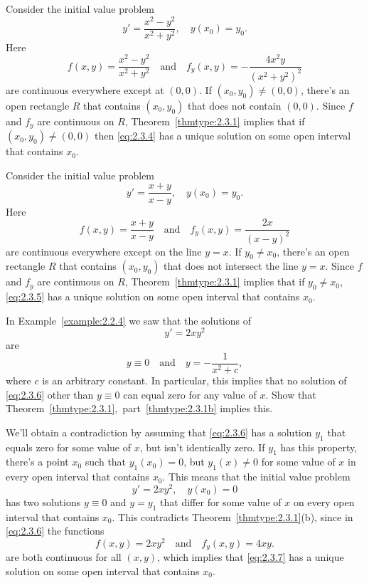 \documentclass{ximera}
\begin{document}
\begin{example}\label{example:2.3.2}
Consider  the initial value problem
\begin{equation} \label{eq:2.3.4}
y'=\frac{x^2-y^2}{x^2+y^2}, \quad y(x_0)=y_0.
\end{equation}
Here
$$
f(x,y)  =  \frac{x^2-y^2}{x^2+y^2} \quad\mbox{and}\quad 
f_y(x,y)  =  -\frac{4x^2y}{(x^2+y^2)^2}
$$
are continuous everywhere except at $(0,0)$. If $(x_0,y_0)
\neq(0,0)$, there's an open rectangle $R$ that contains
$(x_0,y_0)$ that does not contain $(0,0)$. Since $f$ and $f_y$ are
continuous on $R$, Theorem~\ref{thmtype:2.3.1} implies that if
$(x_0,y_0)\neq(0,0)$ then
\eqref{eq:2.3.4}
has a unique solution on some open interval that contains $x_0$.
\end{example}

\begin{example}\label{example:2.3.3}
Consider the initial value problem
\begin{equation} \label{eq:2.3.5}
y'=\frac{x+y}{x-y},\quad y(x_0)=y_0.
\end{equation}
Here
$$
f(x,y)  =  \frac{x+y}{x-y} \quad\mbox{and}\quad 
f_y(x,y)  =  \frac{2x}{(x-y)^2}
$$
are continuous everywhere except on the line $y=x$. If $y_0\neq x_0$,
there's an open rectangle $R$ that contains $(x_0,y_0)$ that
does not intersect the line $y=x$. Since $f$ and $f_y$ are continuous
on $R$, Theorem~\ref{thmtype:2.3.1} implies that if $y_0\neq x_0$,
\eqref{eq:2.3.5} has a unique solution on some open interval that contains
$x_0$.
\end{example}

\begin{example}\label{example:2.3.4}
In Example~\ref{example:2.2.4} we saw that the
solutions of
\begin{equation} \label{eq:2.3.6}
y'=2xy^2
\end{equation}
are
 $$
y\equiv0 \quad\mbox{and}\quad  y=-\frac{1}{x^2+c},
$$
where $c$ is an arbitrary constant. In particular, this implies that
no solution of \eqref{eq:2.3.6} other than $y\equiv0$ can equal zero for
any value of $x$. Show that Theorem~\ref{thmtype:2.3.1},~part~\ref{thmtype:2.3.1b} implies
this.

\begin{explanation}
We'll obtain a contradiction
by assuming that \eqref{eq:2.3.6} has a solution $y_1$ that equals
zero for some value of $x$, but isn't  identically zero. If $y_1$
has this property,  there's a point $x_0$ such that $y_1(x_0)=0$,
but $y_1(x)\neq0$ for some value of $x$ in every open interval that contains
$x_0$. This means that the initial value problem
\begin{equation} \label{eq:2.3.7}
y'=2xy^2,\quad y(x_0)=0
\end{equation}
has two solutions $y\equiv0$ and $y=y_1$ that differ for some value of
$x$ on every open interval that contains $x_0$. This contradicts
Theorem~\ref{thmtype:2.3.1}(b), since in \eqref{eq:2.3.6} the functions
$$
f(x,y)=2xy^2  \quad\mbox{and}\quad  f_y(x,y)= 4xy.
$$
are both continuous
for all $(x,y)$, which implies that \eqref{eq:2.3.7} has a unique
solution on some open interval that contains $x_0$.
\end{explanation}
\end{example}
\end{document}
